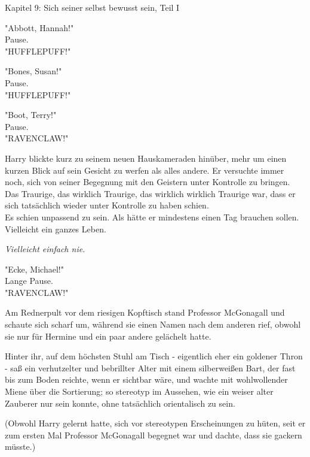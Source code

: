 

\hypertarget{sich-seiner-selbst-bewusst-sein-teil-1}{%

Kapitel 9: Sich seiner selbst bewusst sein, Teil I

"Abbott, Hannah!"\\ Pause.\\ "HUFFLEPUFF!"

"Bones, Susan!"\\ Pause.\\ "HUFFLEPUFF!"

"Boot, Terry!"\\ Pause.\\ "RAVENCLAW!"

Harry blickte kurz zu seinem neuen Hauskameraden hinüber, mehr um einen kurzen Blick auf sein Gesicht zu werfen als alles andere. Er versuchte immer noch, sich von seiner Begegnung mit den Geistern unter Kontrolle zu bringen.\\ Das Traurige, das wirklich Traurige, das wirklich wirklich Traurige war, dass er sich tatsächlich wieder unter Kontrolle zu haben schien.\\ Es schien unpassend zu sein. Als hätte er mindestens einen Tag brauchen sollen. Vielleicht ein ganzes Leben.

\emph{Vielleicht einfach nie.}

"Ecke, Michael!"\\ Lange Pause.\\ "RAVENCLAW!"

Am Rednerpult vor dem riesigen Kopftisch stand Professor McGonagall und schaute sich scharf um, während sie einen Namen nach dem anderen rief, obwohl sie nur für Hermine und ein paar andere gelächelt hatte.

Hinter ihr, auf dem höchsten Stuhl am Tisch - eigentlich eher ein goldener Thron - saß ein verhutzelter und bebrillter Alter mit einem silberweißen Bart, der fast bis zum Boden reichte, wenn er sichtbar wäre, und wachte mit wohlwollender Miene über die Sortierung; so stereotyp im Aussehen, wie ein weiser alter Zauberer nur sein konnte, ohne tatsächlich orientalisch zu sein.

(Obwohl Harry gelernt hatte, sich vor stereotypen Erscheinungen zu hüten, seit er zum ersten Mal Professor McGonagall begegnet war und dachte, dass sie gackern müsste.)

}
